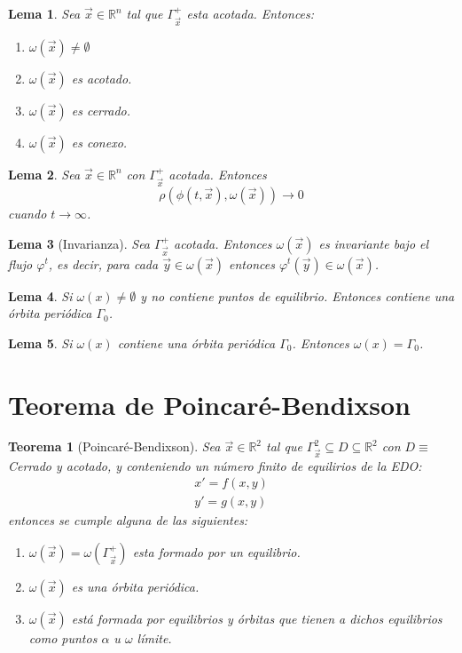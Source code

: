 \documentclass[12pt, a4paper]{report}
\newtheorem{lemma}{Lema}
\newtheorem{theorem}{Teorema}
\begin{document}
\begin{lemma}
	Sea $\vec{x}\in\mathbb{R}^n$ tal que $\Gamma_{\vec{x}}^+$ esta acotada.
	Entonces:
	\begin{enumerate}
		\item $\omega(\vec{x})\neq\emptyset$
		\item $\omega(\vec{x})$ es acotado.
		\item $\omega(\vec{x})$ es cerrado.
		\item $\omega(\vec{x})$ es conexo.
	\end{enumerate}
\end{lemma}

\begin{lemma}
	Sea $\vec{x}\in\mathbb{R}^n$ con $\Gamma_{\vec{x}}^+$ acotada.
	Entonces
	$$\rho(\phi(t,\vec{x}),\omega(\vec{x}))\to0$$
	cuando $t \to \infty$.
\end{lemma}

\begin{lemma}[Invarianza]
	Sea $\Gamma_{\vec{x}}^+$ acotada. Entonces $\omega(\vec{x})$
	es invariante bajo el flujo
	$\varphi^t$, es decir, para cada $\vec{y}\in\omega(\vec{x})$ entonces
	$\varphi ^t(\vec{y})\in\omega(\vec{x})$.
\end{lemma}

\begin{lemma}
	Si $\omega(x)\neq\emptyset$ y no contiene puntos de equilibrio. Entonces contiene una órbita periódica $\varGamma_0$.
\end{lemma}

\begin{lemma}
	Si $\omega(x)$ contiene una órbita periódica $\varGamma_0$. Entonces $\omega(x)=\varGamma_0$.
\end{lemma}

\section{Teorema de Poincaré-Bendixson}

\begin{theorem}[Poincaré-Bendixson]\label{TPB}
	Sea $\vec{x}\in\mathbb{R}^2$ tal que $\varGamma_{\vec{x}}^2\subseteq D\subseteq\mathbb{R}^2$ con $D\equiv$ Cerrado y acotado,
	y conteniendo un número finito de equilirios de la EDO:
	\begin{equation}
		\begin{matrix}
			x' = f(x,y) \\
			y' = g(x,y)
		\end{matrix}
	\end{equation}
	entonces se cumple alguna de las siguientes:
	\begin{enumerate}
		\item $\omega(\vec{x})=\omega(\varGamma_{\vec{x}}^+)$ esta formado por un equilibrio.
		\item $\omega(\vec{x})$ es una órbita periódica.
		\item $\omega(\vec{x})$ está formada por equilibrios y órbitas que tienen a dichos equilibrios como puntos
		      $\alpha$ u $\omega$ límite.
	\end{enumerate}
\end{theorem}
\end{document}
